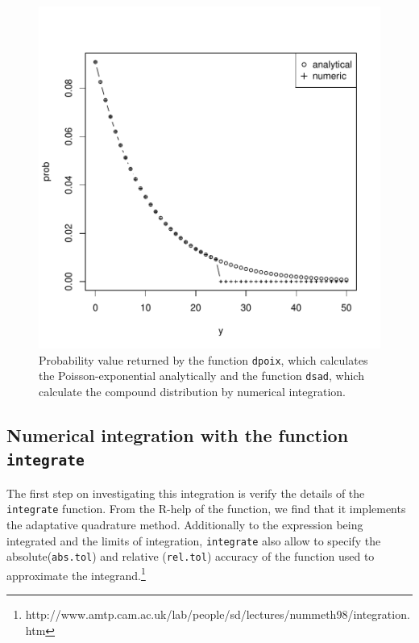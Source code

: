 \documentclass{article}
\newcommand{\code}[1]{\texttt{#1}}
\begin{document}
\begin{figure}[ht]
  \begin{center}
\includegraphics{sads_logbook-006}
\end{center}
\caption{Probability value returned by the function \code{dpoix}, which calculates the Poisson-exponential analytically and the function \code{dsad}, which calculate the compound distribution by numerical integration.}
\label{fig:fig01}
\end{figure}

\subsection*{Numerical integration with the function \code{integrate}}

The first step on investigating this integration is verify the details of the \code{integrate} function. 
From the R-help of the function, we find that it implements the adaptative quadrature method. Additionally to the 
expression being integrated and the limits of integration, \code{integrate} also allow to specify the absolute(\code{abs.tol}) and relative 
(\code{rel.tol}) accuracy of the function used to approximate the integrand.\footnote{
http://www.amtp.cam.ac.uk/lab/people/sd/lectures/nummeth98/integration.htm}
\end{document}
